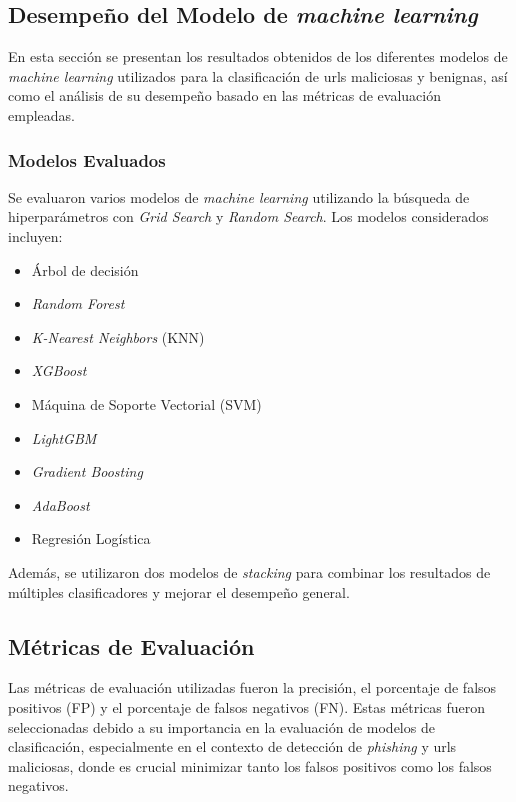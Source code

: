 \subsection{Desempeño del Modelo de \textit{machine learning}}

En esta sección se presentan los resultados obtenidos de los diferentes modelos de \textit{machine learning} utilizados para la clasificación de \glspl{url} maliciosas y benignas, así como el análisis de su desempeño basado en las métricas de evaluación empleadas.

\subsubsection*{Modelos Evaluados}
Se evaluaron varios modelos de \textit{machine learning} utilizando la búsqueda de hiperparámetros con \textit{Grid Search} y \textit{Random Search}. Los modelos considerados incluyen:
\begin{itemize}
    \item Árbol de decisión
    \item \textit{Random Forest}
    \item \textit{K-Nearest Neighbors} (KNN)
    \item \textit{XGBoost}
    \item Máquina de Soporte Vectorial (SVM)
    \item \textit{LightGBM}
    \item \textit{Gradient Boosting}
    \item \textit{AdaBoost}
    \item Regresión Logística
\end{itemize}

Además, se utilizaron dos modelos de \textit{stacking} para combinar los resultados de múltiples clasificadores y mejorar el desempeño general.

\subsection{Métricas de Evaluación}
Las métricas de evaluación utilizadas fueron la precisión, el porcentaje de falsos positivos (FP) y el porcentaje de falsos negativos (FN). Estas métricas fueron seleccionadas debido a su importancia en la evaluación de modelos de clasificación, especialmente en el contexto de detección de \textit{phishing} y \glspl{url} maliciosas, donde es crucial minimizar tanto los falsos positivos como los falsos negativos.

